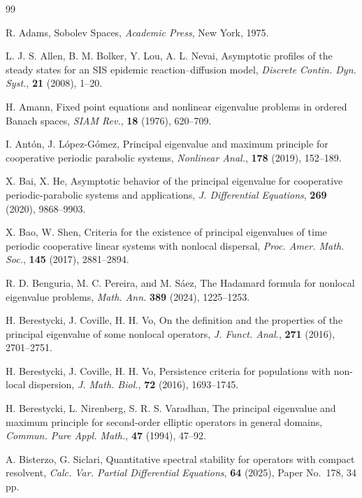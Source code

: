 \documentclass[a4paper,11pt]{amsart}
\theoremstyle{definition}
\numberwithin{equation}{section}
\theoremstyle{definition}
\begin{document}
\begin{thebibliography}{99}


R. Adams, 
Sobolev Spaces, \textit{Academic Press}, New York, 1975.

L. J. S. Allen, B. M. Bolker, Y. Lou, A. L. Nevai, 
Asymptotic profiles of the steady states for an SIS epidemic reaction--diffusion model, 
\textit{Discrete Contin. Dyn. Syst.}, \textbf{21} (2008), 1--20.



H. Amann, 
Fixed point equations and nonlinear eigenvalue problems in ordered Banach spaces, 
\textit{SIAM Rev.}, \textbf{18} (1976), 620--709.

I. Antón, J. López-Gómez, 
Principal eigenvalue and maximum principle for cooperative periodic parabolic systems, 
\textit{Nonlinear Anal.}, \textbf{178} (2019), 152--189.

X. Bai, X. He, 
Asymptotic behavior of the principal eigenvalue for cooperative periodic-parabolic systems and applications, 
\textit{J. Differential Equations}, \textbf{269} (2020), 9868--9903.

X. Bao, W. Shen, 
Criteria for the existence of principal eigenvalues of time periodic cooperative linear systems with nonlocal dispersal, 
\textit{Proc. Amer. Math. Soc.}, \textbf{145} (2017), 2881--2894.


R. D. Benguria, M. C. Pereira, and M. Sáez,
The Hadamard formula for nonlocal eigenvalue problems,
{\it Math. Ann.} {\bf 389} (2024), 1225--1253.

H. Berestycki, J. Coville, H. H. Vo, 
On the definition and the properties of the principal eigenvalue of some nonlocal operators, 
\textit{J. Funct. Anal.}, \textbf{271} (2016), 2701--2751.

H. Berestycki, J. Coville, H. H. Vo, 
Persistence criteria for populations with non-local dispersion, 
\textit{J. Math. Biol.}, \textbf{72} (2016), 1693--1745.

H. Berestycki, L. Nirenberg, S. R. S. Varadhan, 
The principal eigenvalue and maximum principle for second-order elliptic operators in general domains, 
\textit{Commun. Pure Appl. Math.}, \textbf{47} (1994), 47--92.


A. Bisterzo, G. Siclari, 
Quantitative spectral stability for operators with compact resolvent, 
\textit{Calc. Var. Partial Differential Equations}, \textbf{64} (2025), Paper No.~178, 34 pp. 



\end{thebibliography}
\end{document}
